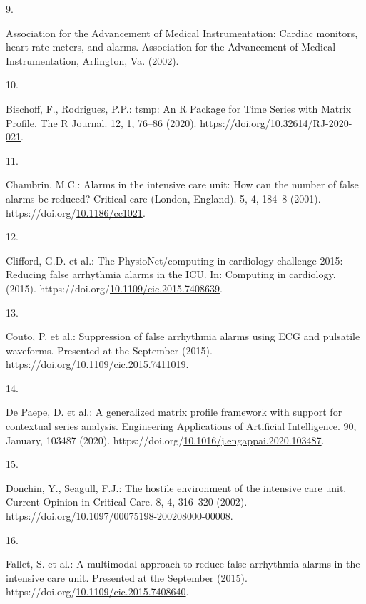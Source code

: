 \documentclass[runningheads]{llncs}
\newlength{\cslhangindent}
\newlength{\csllabelwidth}
\newenvironment{CSLReferences}[2] %
 {%
  \setlength{\parindent}{0pt}
  \ifodd #1 \everypar{\setlength{\hangindent}{\cslhangindent}}\ignorespaces\fi
  \ifnum #2 > 0
  \setlength{\parskip}{#2\baselineskip}
  \fi
 }%
 {}
\newcommand{\CSLLeftMargin}[1]{\parbox[t]{\csllabelwidth}{#1}}
\newcommand{\CSLRightInline}[1]{\parbox[t]{\linewidth - \csllabelwidth}{#1}\break}
\begin{document}
\begin{CSLReferences}{0}{0}
\leavevmode{}%
\CSLLeftMargin{9. }
\CSLRightInline{Association for the Advancement of Medical Instrumentation: {Cardiac monitors, heart rate meters, and alarms}. Association for the Advancement of Medical Instrumentation, Arlington, Va. (2002).}

\leavevmode{}%
\CSLLeftMargin{10. }
\CSLRightInline{Bischoff, F., Rodrigues, P.P.: {tsmp: An R Package for Time Series with Matrix Profile}. {The R Journal}. 12, 1, 76--86 (2020). https://doi.org/\href{https://doi.org/10.32614/RJ-2020-021}{10.32614/RJ-2020-021}.}

\leavevmode{}%
\CSLLeftMargin{11. }
\CSLRightInline{Chambrin, M.C.: Alarms in the intensive care unit: How can the number of false alarms be reduced? Critical care (London, England). 5, 4, 184--8 (2001). https://doi.org/\href{https://doi.org/10.1186/cc1021}{10.1186/cc1021}.}

\leavevmode{}%
\CSLLeftMargin{12. }
\CSLRightInline{Clifford, G.D. et al.: The PhysioNet/computing in cardiology challenge 2015: Reducing false arrhythmia alarms in the ICU. In: Computing in cardiology. (2015). https://doi.org/\href{https://doi.org/10.1109/cic.2015.7408639}{10.1109/cic.2015.7408639}.}

\leavevmode{}%
\CSLLeftMargin{13. }
\CSLRightInline{Couto, P. et al.: Suppression of false arrhythmia alarms using ECG and pulsatile waveforms. Presented at the September (2015). https://doi.org/\href{https://doi.org/10.1109/cic.2015.7411019}{10.1109/cic.2015.7411019}.}

\leavevmode{}%
\CSLLeftMargin{14. }
\CSLRightInline{De Paepe, D. et al.: {A generalized matrix profile framework with support for contextual series analysis}. Engineering Applications of Artificial Intelligence. 90, January, 103487 (2020). https://doi.org/\href{https://doi.org/10.1016/j.engappai.2020.103487}{10.1016/j.engappai.2020.103487}.}

\leavevmode{}%
\CSLLeftMargin{15. }
\CSLRightInline{Donchin, Y., Seagull, F.J.: The hostile environment of the intensive care unit. Current Opinion in Critical Care. 8, 4, 316--320 (2002). https://doi.org/\href{https://doi.org/10.1097/00075198-200208000-00008}{10.1097/00075198-200208000-00008}.}

\leavevmode{}%
\CSLLeftMargin{16. }
\CSLRightInline{Fallet, S. et al.: A multimodal approach to reduce false arrhythmia alarms in the intensive care unit. Presented at the September (2015). https://doi.org/\href{https://doi.org/10.1109/cic.2015.7408640}{10.1109/cic.2015.7408640}.}


\end{CSLReferences}
\end{document}
